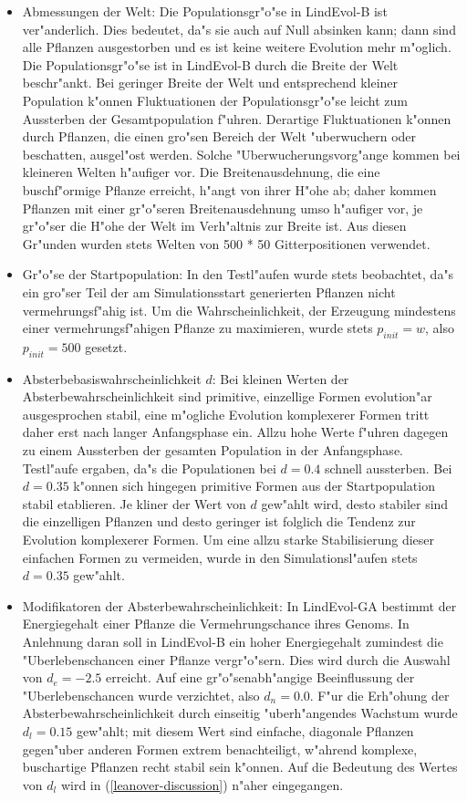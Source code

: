 \begin{itemize}

\item Abmessungen der Welt: Die Populationsgr"o"se in LindEvol-B ist ver"anderlich. Dies bedeutet,
da"s sie auch auf Null absinken kann; dann sind alle Pflanzen ausgestorben und es ist keine weitere
Evolution mehr m"oglich. Die Populationsgr"o"se ist in LindEvol-B durch die Breite der Welt
beschr"ankt. Bei geringer Breite der Welt und entsprechend kleiner Population k"onnen Fluktuationen
der Populationsgr"o"se leicht zum Aussterben der Gesamtpopulation f"uhren. Derartige Fluktuationen
k"onnen durch Pflanzen, die einen gro"sen Bereich der Welt "uberwuchern oder beschatten, ausgel"ost werden. Solche
"Uberwucherungsvorg"ange kommen bei kleineren Welten h"aufiger vor. Die Breitenausdehnung, die eine
buschf"ormige Pflanze erreicht, h"angt von ihrer H"ohe ab; daher kommen Pflanzen mit einer gr"o"seren
Breitenausdehnung umso h"aufiger vor, je gr"o"ser die H"ohe der Welt im Verh"altnis zur Breite ist.
Aus diesen Gr"unden wurden stets Welten von 500 * 50 Gitterpositionen verwendet.

\item Gr"o"se der Startpopulation: In den Testl"aufen wurde stets beobachtet, da"s ein gro"ser Teil
der am Simulationsstart generierten Pflanzen nicht vermehrungsf"ahig ist. Um die Wahrscheinlichkeit,
der Erzeugung mindestens einer vermehrungsf"ahigen Pflanze zu maximieren, wurde stets $p_{\mathit{init}}=w$,
also $p_{\mathit{init}}=500$ gesetzt.

\item Absterbebasiswahrscheinlichkeit $d$: Bei kleinen Werten der Absterbewahrscheinlichkeit sind primitive,
einzellige Formen evolution"ar ausgesprochen stabil, eine m"ogliche Evolution komplexerer Formen tritt daher erst nach
langer Anfangsphase ein. Allzu hohe Werte f"uhren dagegen zu einem Aussterben der gesamten Population in der
Anfangsphase. Testl"aufe ergaben, da"s die Populationen bei $d=0.4$ schnell aussterben. Bei $d=0.35$ k"onnen sich
hingegen primitive Formen aus der Startpopulation stabil etablieren. Je kliner der Wert von $d$ gew"ahlt wird,
desto stabiler sind die einzelligen Pflanzen und desto geringer ist folglich die Tendenz zur Evolution komplexerer
Formen. Um eine allzu starke Stabilisierung dieser
einfachen Formen zu vermeiden, wurde in den Simulationsl"aufen stets $d=0.35$ gew"ahlt.

\item Modifikatoren der Absterbewahrscheinlichkeit: In LindEvol-GA bestimmt der Energiegehalt einer Pflanze die
Vermehrungschance ihres Genoms. In Anlehnung daran soll in LindEvol-B ein hoher Energiegehalt zumindest die
"Uberlebenschancen einer Pflanze vergr"o"sern. Dies wird durch die Auswahl von $d_e=-2.5$ erreicht. Auf eine gr"o"senabh"angige
Beeinflussung der "Uberlebenschancen wurde verzichtet, also $d_n = 0.0$. F"ur die Erh"ohung der Absterbewahrscheinlichkeit
durch einseitig "uberh"angendes Wachstum wurde $d_l = 0.15$ gew"ahlt; mit diesem Wert sind einfache, diagonale
Pflanzen gegen"uber anderen Formen extrem benachteiligt, w"ahrend komplexe, buschartige Pflanzen recht stabil sein
k"onnen. Auf die Bedeutung des Wertes von $d_l$ wird in (\ref{leanover-discussion}) n"aher eingegangen.


\end{itemize}
